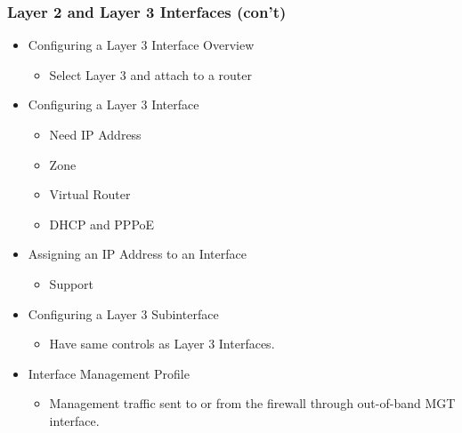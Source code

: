 \subsubsection{Layer 2 and Layer 3 Interfaces (con't)}
    \begin{itemize}
        \item Configuring a Layer 3 Interface Overview
            \begin{itemize}
                \item Select Layer 3 and attach to a router
            \end{itemize}
        \item Configuring a Layer 3 Interface
            \begin{itemize}
                \item Need IP Address
                \item Zone
                \item Virtual Router
                \item DHCP and PPPoE
            \end{itemize}
        \item Assigning an IP Address to an Interface
            \begin{itemize}
                \item Support 
            \end{itemize}
        \item Configuring a Layer 3 Subinterface
            \begin{itemize}
                \item Have same controls as Layer 3 Interfaces.
            \end{itemize}
        \item Interface Management Profile
            \begin{itemize}
                \item Management traffic sent to or from the firewall through out-of-band MGT interface.
            \end{itemize}
    \end{itemize}
    

